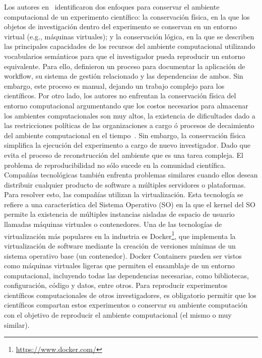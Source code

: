 Los autores en~\cite{santana2017reproducibility} identificaron dos enfoques para conservar el ambiente computacional de un experimento científico: la conservación física, en la que los objetos de investigación dentro del experimento se conservan en un entorno virtual (e.g., máquinas virtuales); y la conservación lógica, en la que se describen las principales capacidades de los recursos del ambiente computacional utilizando vocabularios semánticos para que el investigador pueda reproducir un entorno equivalente.
Para ello, definieron un proceso para documentar la aplicación de workflow, su sistema de gestión relacionado y las dependencias de ambos.
Sin embargo, este proceso es manual, dejando un trabajo complejo para los científicos. 
Por otro lado, los autores no enfrentan la conservación física del entorno computacional argumentando que los costos necesarios para almacenar los ambientes computacionales son muy altos, la existencia de dificultades dado a las restricciones políticas de las organizaciones a cargo ó procesos de decaimiento del ambiente computacional en el tiempo~\cite{DBLP:journals/fgcs/DeelmanVJRCMMCS15}. Sin embargo, la conservación física simplifica la ejecución del experimento a cargo de nuevo investigador. Dado que evita el proceso de reconstrucción del ambiente que es una tarea compleja.
El problema de reproducibilidad no sólo sucede en la comunidad científica. Compañías tecnológicas también enfrenta problemas similares cuando ellos desean distribuir cualquier producto de software a múltiples servidores o plataformas.
Para resolver esto, las compañías utilizan la virtualización. Esta tecnología se refiere a una característica del Sistema Operativo (SO) en la que el kernel del SO permite la existencia de múltiples instancias aisladas de espacio de usuario llamadas máquinas virtuales o contenedores.
Una de las tecnologías de virtualización más populares en la industria es Docker\footnote{\url{https://www.docker.com/}}, que implementa la virtualización de software mediante la creación de versiones mínimas de un sistema operativo base (un contenedor).
Docker Containers pueden ser vistos como máquinas virtuales ligeras que permiten el ensamblaje de un entorno computacional, incluyendo todas las dependencias necesarias, como bibliotecas, configuración, código y datos, entre otros.
Para reproducir experimentos científicos computacionales de otros investigadores, es obligatorio permitir que los científicos compartan estos experimentos o conservar su ambiente computación con el objetivo de reproducir el ambiente computacional  (el mismo o muy similar).
